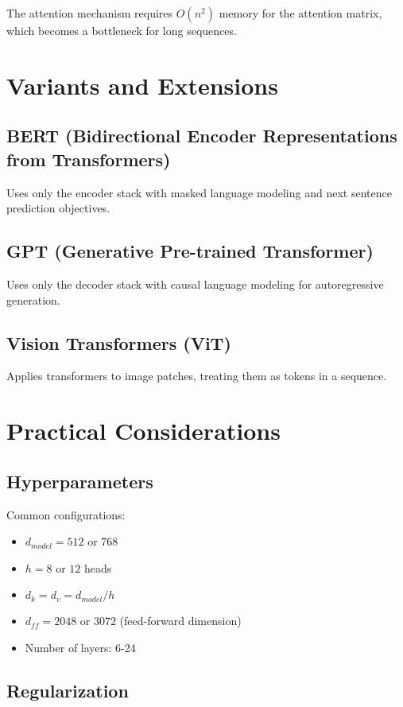 \documentclass[12pt,a4paper]{article}
\begin{document}
The attention mechanism requires $O(n^2)$ memory for the attention matrix, which becomes a bottleneck for long sequences.

\section{Variants and Extensions}

\subsection{BERT (Bidirectional Encoder Representations from Transformers)}

Uses only the encoder stack with masked language modeling and next sentence prediction objectives.

\subsection{GPT (Generative Pre-trained Transformer)}

Uses only the decoder stack with causal language modeling for autoregressive generation.

\subsection{Vision Transformers (ViT)}

Applies transformers to image patches, treating them as tokens in a sequence.

\section{Practical Considerations}

\subsection{Hyperparameters}

Common configurations:
\begin{itemize}
    \item $d_{model} = 512$ or $768$
    \item $h = 8$ or $12$ heads
    \item $d_k = d_v = d_{model}/h$
    \item $d_{ff} = 2048$ or $3072$ (feed-forward dimension)
    \item Number of layers: 6-24
\end{itemize}

\subsection{Regularization}
\end{document}
